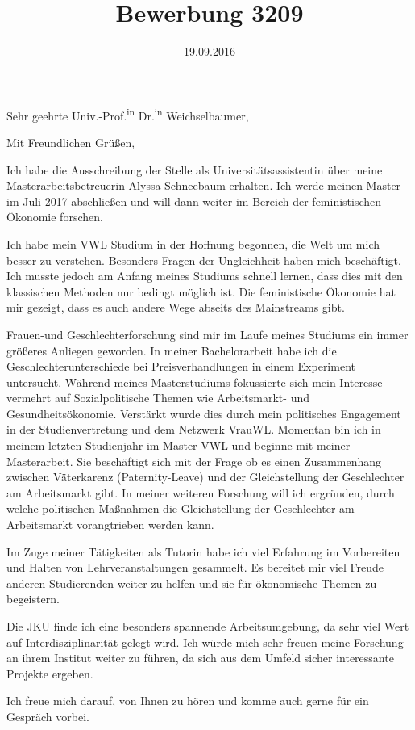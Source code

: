 \documentclass[11pt,a4paper,sans]{moderncv}
\title{Bewerbung 3209}\address{Obere Ried 9}{1220 Wien}
\begin{document}
\date{19.09.2016}
\opening{ Sehr geehrte Univ.-Prof.\textsuperscript{in} Dr.\textsuperscript{in} Weichselbaumer,}
\closing{Mit Freundlichen Grüßen,}
\makelettertitle
\justify
Ich habe die Ausschreibung der Stelle als Universitätsassistentin über meine Masterarbeitsbetreuerin Alyssa Schneebaum erhalten.  Ich werde meinen Master im Juli 2017 abschließen und will dann weiter im Bereich der feministischen Ökonomie forschen.
\par Ich habe mein VWL Studium in der Hoffnung begonnen, die Welt um mich besser zu verstehen. Besonders Fragen der Ungleichheit haben mich beschäftigt. Ich musste jedoch am Anfang meines Studiums schnell lernen, dass dies mit den klassischen Methoden nur bedingt möglich ist.
Die feministische Ökonomie hat mir gezeigt, dass es auch andere Wege abseits des Mainstreams gibt.
\par Frauen-und Geschlechterforschung sind mir im Laufe meines Studiums ein immer größeres Anliegen geworden. In meiner Bachelorarbeit habe ich die Geschlechterunterschiede bei Preisverhandlungen in einem Experiment untersucht. Während meines Masterstudiums fokussierte sich mein Interesse vermehrt auf Sozialpolitische Themen wie Arbeitsmarkt- und Gesundheitsökonomie. Verstärkt wurde dies durch mein politisches Engagement in der Studienvertretung und dem Netzwerk VrauWL.
Momentan bin ich in meinem letzten Studienjahr im Master VWL und beginne mit meiner Masterarbeit. Sie beschäftigt sich mit der Frage ob es einen Zusammenhang zwischen Väterkarenz (Paternity-Leave) und der Gleichstellung der Geschlechter am Arbeitsmarkt gibt. In meiner weiteren Forschung will ich ergründen, durch welche politischen Maßnahmen die Gleichstellung der Geschlechter am Arbeitsmarkt vorangtrieben werden kann.
\par Im Zuge meiner Tätigkeiten als Tutorin habe ich viel Erfahrung im Vorbereiten und Halten von Lehrveranstaltungen gesammelt. Es bereitet mir viel Freude anderen Studierenden weiter zu helfen und sie für ökonomische Themen zu begeistern.
\par Die JKU finde ich eine besonders spannende Arbeitsumgebung, da sehr viel Wert auf Interdisziplinarität gelegt wird. Ich würde mich sehr freuen meine Forschung an ihrem Institut weiter zu führen, da sich aus dem Umfeld sicher interessante Projekte ergeben. \\
\par Ich freue mich darauf, von Ihnen zu hören und komme auch gerne für ein Gespräch vorbei.\\
\makeletterclosing
\end{document}
